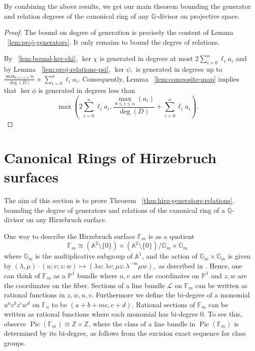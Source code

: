 \documentclass{amsart}
\theoremstyle{plain}
\theoremstyle{definition}
\theoremstyle{remark}
\numberwithin{equation}{section}
\newcommand\bq{{\mathbb Q}}
\newcommand\bp{{\mathbb P}}
\newcommand\bz{{\mathbb Z}}
\newcommand\ba{{\mathbb A}}
\newcommand\bida{a}
\newcommand\hirz{\mathbb{F}}
\DeclareMathOperator{\Pic}{Pic}
\begin{document}
By combining the above results, we get our main theorem bounding
the generator and relation degrees of the canonical ring of any
$\bq$-divisor on projective space.

\restateproj*

\begin{proof}
The bound on degree of generation is precisely the content of Lemma 
~\ref{lem:proj-generators}. It only remains to bound the degree of 
relations.

By ~\ref{lem:bound-ker-chi}, $\ker \chi$ is generated in degrees 
at most $2\sum_{i=0}^n \ell_i a_i$ and by Lemma
~\ref{lem:proj-relations-psi}, $\ker \psi,$ is generated in
degrees up to $\frac{\max_{0 \leq i \leq n} \bida_i}{\deg(D)} + \sum_{i=0}^n \ell_i a_i$. 
Consequently, Lemma ~\ref{lem:composite-map} implies that $\ker \phi$
is generated in degrees less than
\[
	\max \left(2 \sum_{i=0}^n \ell_i a_i, \frac{\max_{0\le i \le n}
	(\bida_i)}{\deg(D)} + \sum_{i=0}^n \ell_i a_i \right).
\]
\end{proof}

\section{Canonical Rings of Hirzebruch surfaces}
\label{sec:hirz}
The aim of this section is to prove Theorem
~\ref{thm:hirz-generators-relations}, bounding the degree of
generators and relations of the canonical ring of a $\bq$-divisor
on any Hirzebruch surface.

One way to describe the Hirzebruch surface $\hirz_m$ is as a quotient
\[
\hirz_m \cong (\ba^2 \setminus \{0\}) \times (\ba^2 \setminus \{0\})/\mathbb G_m \times \mathbb G_m
\]
where $\mathbb G_m$ is the multiplicative subgroup of $\ba^1$, and the action of $\mathbb G_m \times \mathbb G_m$ is given by
$(\lambda, \mu) \cdot (u\colon v; z\colon w) \mapsto (\lambda u\colon \lambda v; \mu z\colon \lambda^{-m} \mu w),$ as described in \cite[p.~ 6]{zhao:counting-cubic}. Hence, one can think of
$\hirz_m$ as a $\bp^1$ bundle where $u,v$ are the coordinates on
$\bp^1$ and $z,w$ are the coordinates on the fiber.
Sections of a line bundle $\mathscr L$ on $\hirz_m$ can be written as
rational functions in $z, w, u, v$.
Furthermore we define the bi-degree of a monomial $u^a v^{b} z^c w^d$
on $\hirz_n$ to be
$(a + b + mc, c + d)$. Rational sections of $\hirz_m$ can be written as
rational functions where each monomial has bi-degree 0. To see this, 
observe
$\Pic(\hirz_m) \cong \bz \times \bz$, where the class of a line bundle
in $\Pic(\hirz_m)$
is determined by its bi-degree, as follows from the excision exact sequence
for class groups.
\end{document}
